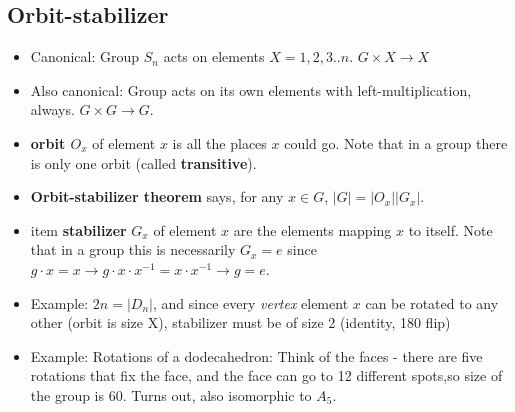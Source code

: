 \documentclass[11pt, oneside]{article}   	%
\begin{document}
\subsection{Orbit-stabilizer}
\begin{itemize}
\item Canonical: Group $S_n$ acts on elements $X = {1, 2, 3 .. n}$.  $G \times X \rightarrow X$
\item Also canonical: Group acts on its own elements with left-multiplication, always.  $G \times G \rightarrow G$.
\item \textbf{orbit $O_x$} of element $x$ is all the places $x$ could go.  Note that in a group there is only one orbit (called \textbf{transitive}).
\item \textbf{Orbit-stabilizer theorem} says, for any $x \in G$, $|G| = |O_x| |G_x|$.
\item item \textbf{stabilizer} $G_x$ of element $x$ are the elements mapping $x$ to itself.  Note that in a group this is necessarily $G_x = {e}$ since $g \cdot x = x \rightarrow g \cdot x \cdot x^{-1} = x \cdot x^{-1} \rightarrow g = e$.
\item Example: $2n = |D_n|$, and since every \emph{vertex} element $x$ can be rotated to any other (orbit is size X), stabilizer must be of size 2 (identity, 180 flip)
\item Example: Rotations of a dodecahedron: Think of the faces - there are five rotations that fix the face, and the face can go to 12 different spots,so size of the group is 60. Turns out, also isomorphic to $A_5$.
\end{itemize}
\end{document}
